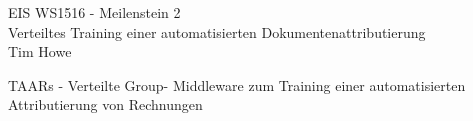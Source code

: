 \documentclass[11pt,oneside,a4paper,notitlepage]{book}
\newcommand{\brand}{TAARs }
\begin{document}
\begin{center}
\Large{EIS WS1516 - Meilenstein 2}\\[3mm]
\normalsize{Verteiltes Training einer automatisierten Dokumentenattributierung}\\[3mm]
\normalsize{Tim Howe}
\end{center}

\brand - Verteilte Group- Middleware zum Training einer automatisierten Attributierung von Rechnungen


\tableofcontents


\newpage














\end{document}
